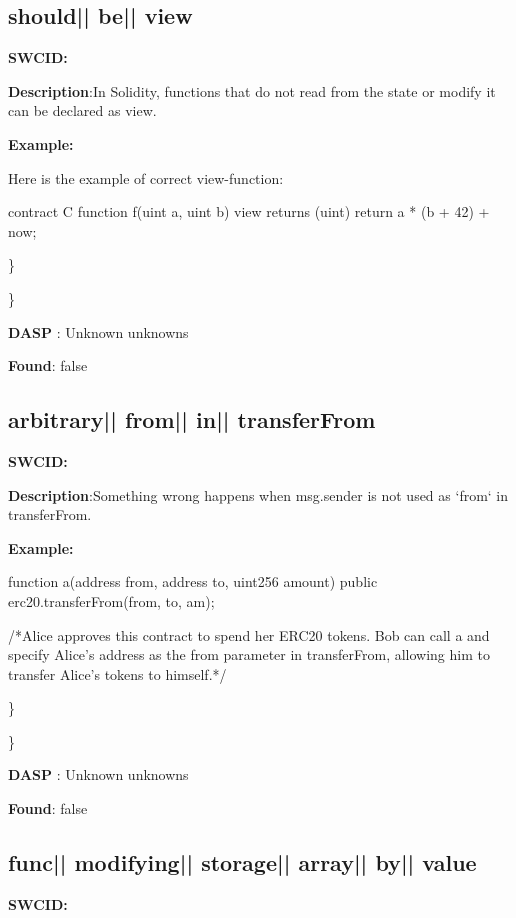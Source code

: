 \documentclass{article}
\begin{document}
\subsection{should{|\textunderscore| }be{|\textunderscore| }view} 
\textbf{SWC{\textunderscore }ID:} 

\textbf{Description}:In Solidity, functions that do not read from the state or modify it can be declared as view.


\textbf{Example:} 
\begin{ffcode} 

Here is the example of correct view-function:

contract C {
    function f(uint a, uint b) view returns (uint) {
        return a * (b + 42) + now;
    }
}

\end{ffcode} 
\} 

\} 

\textbf{DASP} : Unknown unknowns

\textbf{Found}: false

\subsection{arbitrary{|\textunderscore| }from{|\textunderscore| }in{|\textunderscore| }transferFrom} 
\textbf{SWC{\textunderscore }ID:} 

\textbf{Description}:Something wrong happens when msg.sender is not used as `from` in transferFrom.


\textbf{Example:} 
\begin{ffcode} 

function a(address from, address to, uint256 amount) public {
  erc20.transferFrom(from, to, am);
}

 /*Alice approves this contract to spend her ERC20 tokens. Bob can call a and specify Alice's address as the from parameter in transferFrom, allowing him to transfer Alice's tokens to himself.*/ 

\end{ffcode} 
\} 

\} 

\textbf{DASP} : Unknown unknowns

\textbf{Found}: false

\subsection{func{|\textunderscore| }modifying{|\textunderscore| }storage{|\textunderscore| }array{|\textunderscore| }by{|\textunderscore| }value} 
\textbf{SWC{\textunderscore }ID:} 
\end{document}
